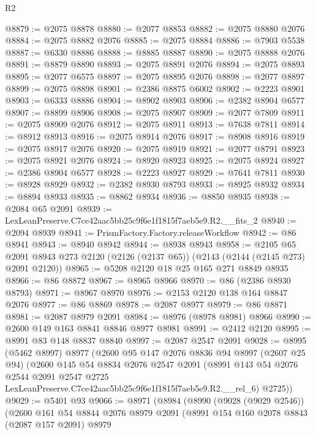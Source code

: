 \begin{lexlean}{R2}
\begin{coremodule}
@8879 := @2075 @8878
@8880 := @2077 @8853
@8882 := @2075 @8880 @2076
@8884 := @2075 @8882 @2076
@8885 := @2075 @8884
@8886 := @7903 @5538
@8887 := @6330 @8886
@8888 := @8885 @8887
@8890 := @2075 @8888 @2076
@8891 := @8879 @8890
@8893 := @2075 @8891 @2076
@8894 := @2075 @8893
@8895 := @2077 @6575
@8897 := @2075 @8895 @2076
@8898 := @2077 @8897
@8899 := @2075 @8898
@8901 := @2386 @8875 @6002
@8902 := @2223 @8901
@8903 := @6333 @8886
@8904 := @8902 @8903
@8906 := @2382 @8904 @6577
@8907 := @8899 @8906
@8908 := @2075 @8907
@8909 := @2077 @7809
@8911 := @2075 @8909 @2076
@8912 := @2075 @8911
@8913 := @7638 @7811
@8914 := @8912 @8913
@8916 := @2075 @8914 @2076
@8917 := @8908 @8916
@8919 := @2075 @8917 @2076
@8920 := @2075 @8919
@8921 := @2077 @8791
@8923 := @2075 @8921 @2076
@8924 := @8920 @8923
@8925 := @2075 @8924
@8927 := @2386 @8904 @6577
@8928 := @2223 @8927
@8929 := @7641 @7811
@8930 := @8928 @8929
@8932 := @2382 @8930 @8793
@8933 := @8925 @8932
@8934 := @8894 @8933
@8935 := @8862 @8934
@8936 := @8850 @8935
@8938 := @2084 @65 @2091
@8939 := LexLeanPreserve.C7ce42aac5bb25c9f6e1f1815f7aeb5e9.R2.__fits_2
@8940 := @2094 @8939
@8941 := PrismFactory.Factory.releaseWorkflow
@8942 := @86 @8941
@8943 := @8940 @8942
@8944 := @8938 @8943
@8958 := @2105
    @65
    @2091
    @8943
    @273
    @2120
    (@2126 (@2137 @65))
    (@2143 (@2144 (@2145 @273) @2091 @2120))
@8965 := @5208 @2120 @18 @25 @165 @271 @8849 @8935
@8966 := @86 @8872
@8967 := @8965 @8966
@8970 := @86 (@2386 @8930 @8793)
@8971 := @8967 @8970
@8976 := @2153 @2120 @138 @164 @8847 @2076
@8977 := @86 @8869
@8978 := @2087 @8977
@8979 := @86 @8871
@8981 := @2087 @8979 @2091
@8984 := @8976 (@8978 @8981) @8966
@8990 := @2600 @149 @163 @8841 @8846 @8977 @8981
@8991 := @2412 @2120
@8995 := @8991 @83 @148 @8837 @8840
@8997 := @2087 @2547 @2091
@9028 := @8995
    (@5462 @8997)
    @8977
    (@2600
      @95
      @147
      @2076
      @8836
      @94
      @8997
      (@2607 @25 @94)
      (@2600
        @145
        @54
        @8834
        @2076
        @2547
        @2091
        (@8991
          @143
          @54
          @2076
          @2544
          @2091
          @2547
          @2725
          LexLeanPreserve.C7ce42aac5bb25c9f6e1f1815f7aeb5e9.R2.__rel_6)
        @2725))
@9029 := @5401 @93
@9066 := @8971
    (@8984
      (@8990
        (@9028 (@9029 @2546))
        (@2600
          @161
          @54
          @8844
          @2076
          @8979
          @2091
          (@8991
            @154
            @160
            @2078
            @8843
            (@2087 @157 @2091)
            @8979

\end{coremodule}
\end{lexlean}
